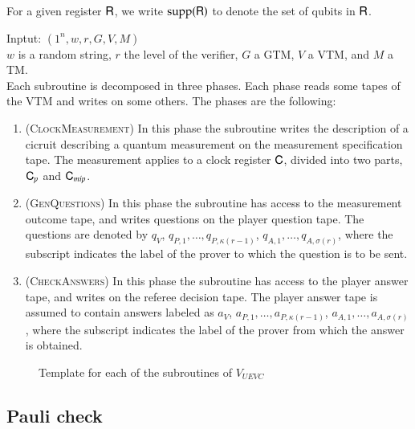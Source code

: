 For a given register ${\mathsf{R}}$, we write $\operatorname{supp}({\mathsf{R}})$ to denote the set of qubits in ${\mathsf{R}}$.






\vspace{10pt}
\begin{center}
\begin{mdframed}
Inptut: $(1^n,w,r,G,V,M)$\\
  $w$ is a random string, $r$ the level of the verifier, $G$ a GTM, $V$ a VTM, and $M$ a TM.\\
Each subroutine is decomposed in three phases. Each phase reads some tapes of the VTM and writes on some others. The phases are the following: 
	\begin{enumerate}
		\item (\textsc{ClockMeasurement}) In this phase the subroutine writes the description of a cicruit describing a quantum measurement on the measurement specification tape. The measurement applies to a clock register ${\mathsf{C}}$, divided into two parts, ${\mathsf{C}}_{p}$ and ${\mathsf{C}}_{mip}$. 
	\item (\textsc{GenQuestions}) In this phase the subroutine has access to the measurement outcome tape, and writes questions on the player question tape. The questions are denoted  by $q_V$, $q_{P,1},\ldots,q_{P,\kappa(r-1)}$, $q_{A,1},\ldots,q_{A,\sigma(r)}$, where the subscript indicates the label of the prover to which the question is to be sent. 
		\item (\textsc{CheckAnswers}) In this phase the subroutine has access to the player answer tape, and writes on the referee decision tape. The player answer tape is assumed to contain answers labeled as $a_V$, $a_{P,1},\ldots,a_{P,\kappa(r-1)}$, $a_{A,1},\ldots,a_{A,\sigma(r)}$, where the subscript indicates the label of the prover from which the answer is obtained.
	\end{enumerate}    
\end{mdframed}

\end{center}
\begin{figure}[H]
\caption{Template for each of the subroutines of $V_{UEVC}$}
\label{fig:check_structure}
\end{figure}






\subsection{Pauli check}
\label{sec:pauli_check}

